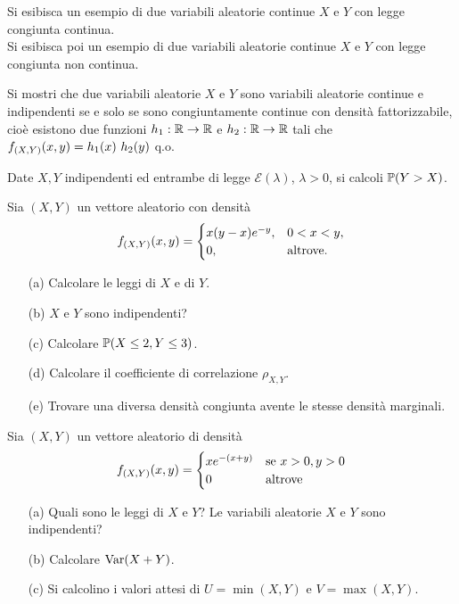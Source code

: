 \begin{enumerate}
\end{enumerate}


\newpage

\ParteEsercizi

\Esercizio{} %
Si esibisca un esempio di due variabili aleatorie continue $X$ e $Y$ con legge congiunta continua. \\
Si esibisca poi un esempio di due variabili aleatorie continue $X$ e $Y$ con legge congiunta non continua.

\Esercizio{$^\ast$}
Si mostri che due variabili aleatorie $X$ e $Y$ sono variabili aleatorie continue e indipendenti se e solo se sono congiuntamente continue con densità fattorizzabile, cioè esistono due funzioni $h_1:\mathbb{R}\to\mathbb{R}$ e $h_2:\mathbb{R}\to\mathbb{R}$ tali che $f_{(X,Y)}(x,y)=h_1(x)\ h_2(y)$ q.o.

\Esercizio{}
Date $X,Y$ indipendenti ed entrambe di legge $\mathcal{E}(\lambda)$, $\lambda>0$, si calcoli $\mathbb{P}(Y>X)$.

\Esercizio{}
Sia $(X,Y)$ un vettore aleatorio con densità
\begin{equation*}
f_{(X,Y)}(x,y)=\begin{cases} x(y-x)e^{-y},&0<x<y, \\ 0,&\text{altrove}.\end{cases}
\end{equation*}
\begin{enumerate}
\item [(a)] Calcolare le leggi di $X$ e di $Y$.
\item [(b)] $X$ e $Y$ sono indipendenti?
\item [(c)] Calcolare $\mathbb{P}(X\leq 2,Y\leq 3)$.
\item [(d)] Calcolare il coefficiente di correlazione $\rho_{X,Y}$.
\item [(e)] Trovare una diversa densità congiunta avente le stesse densità marginali.
\end{enumerate}

\Esercizio{}
Sia $(X,Y)$ un vettore aleatorio di densità
\[
f_{(X,Y)}(x,y)=\begin{cases}
xe^{-(x+y)} &\text{se }x>0,y>0 \\
0 &\text{altrove}
\end{cases}
\]
\begin{enumerate}
\item [(a)] Quali sono le leggi di $X$ e $Y$? Le variabili aleatorie $X$ e $Y$ sono indipendenti?
\item [(b)] Calcolare $\operatorname{Var}(X+Y)$.
\item [(c)] Si calcolino i valori attesi di $U=\min(X,Y)$ e $V=\max(X,Y)$.
\end{enumerate}

